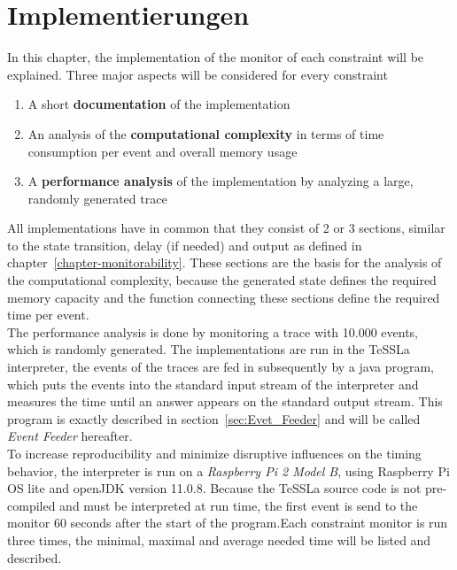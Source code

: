 
\chapter{Implementierungen}
\label{chapter-implementation}

	In this chapter, the implementation of the monitor of each constraint will be explained. Three major aspects will be considered for every constraint
	\begin{enumerate}[1.]
		\item
			A short \textbf{documentation} of the implementation
		\item
			An analysis of the \textbf{computational complexity} in terms of time consumption per event and overall memory usage
		\item
			A \textbf{performance analysis} of the implementation by analyzing a large, randomly generated trace
	\end{enumerate}

	All implementations have in common that they consist of 2 or 3 sections, similar to the state transition, delay (if needed) and output as defined in chapter~\ref{chapter-monitorability}. These sections are the basis for the analysis of the computational complexity, because the generated state defines the required memory capacity and the function connecting these sections define the required time per event.\\
	The performance analysis is done by monitoring a trace with 10.000 events, which is randomly generated. The implementations are run in the TeSSLa interpreter, the events of the traces are fed in subsequently by a java program, which puts the events into the standard input stream of the interpreter and measures the time until an answer appears on the standard output stream. This program is exactly described in section~\ref{sec:Evet_Feeder} and will be called \emph{Event Feeder} hereafter.\\
	To increase reproducibility and minimize disruptive influences on the timing behavior, the interpreter is run on a \emph{Raspberry Pi 2 Model B}, using Raspberry Pi OS lite and openJDK version 11.0.8. Because the TeSSLa source code is not pre-compiled and must be interpreted at run time, the first event is send to the monitor 60 seconds after the start of the program.Each constraint monitor is run three times, the minimal, maximal and average needed time will be listed and described.
	
